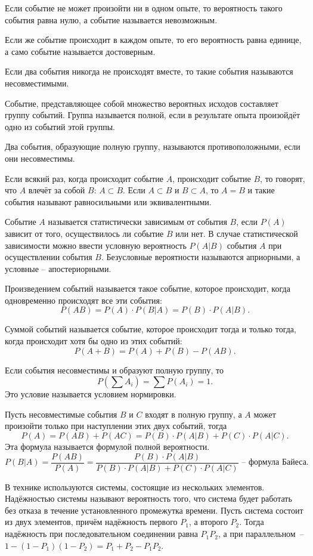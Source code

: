 Если событие не может произойти ни в одном опыте, то вероятность такого события
равна нулю, а событие называется невозможным.

Если же событие происходит в каждом опыте, то его вероятность равна единице, а
само событие называется достоверным.

Если два события никогда не происходят вместе, то такие события называются
несовместимыми.

Событие, представляющее собой множество вероятных исходов составляет группу
событий. Группа называется полной, если в результате опыта произойдёт одно из
событий этой группы.

Два события, образующие полную группу, называются противоположными, если они
несовместимы.

Если всякий раз, когда происходит событие \( A \), происходит событие \( B \),
то говорят, что \( A \) влечёт за собой \( B \): \( A \subset B \). Если
\( A \subset B \) и \( B \subset A \), то \( A = B \) и такие события называют
равносильными или эквивалентными.

Событие \( A \) называется статистически зависимым от события \( B \), если
\( P(A) \) зависит от того, осуществилось ли событие \( B \) или нет. В случае
статистической зависимости можно ввести условную вероятность \( P(A|B) \)
события \( A \) при осуществлении события \( B \). Безусловные вероятности
называются априорными, а условные -- апостериорными.

Произведением событий называется такое событие, которое происходит, когда
одновременно происходят все эти события:
\[
    P(AB) = P(A) \cdot P(B|A) = P(B) \cdot P(A|B).
\]

Суммой событий называется событие, которое происходит тогда и только тогда,
когда происходит хотя бы одно из этих событий:
\[
    P(A+B) = P(A) + P(B) - P(AB).
\]

Если события несовместимы и образуют полную группу, то
\[
    P\left(\sum A_i\right) = \sum P(A_i) = 1.
\]
Это условие называется условием нормировки.

Пусть несовместимые события \( B \) и \( C \) входят в полную группу, а \( A \)
может произойти только при наступлении этих двух событий, тогда
\[
    P(A) = P(AB) + P(AC) = P(B) \cdot P(A|B) + P(C) \cdot P(A|C).
\]
Эта формула называется формулой полной вероятности.
\[
    P(B|A) = \frac{P(AB)}{P(A)} = \frac{P(B) \cdot P(A|B)}
    {P(B) \cdot P(A|B) + P(C) \cdot P(A|C)} \text{ -- формула Байеса.}
\]

В технике используются системы, состоящие из нескольких элементов. Надёжностью
системы называют вероятность того, что система будет работать без отказа в
течение установленного промежутка времени. Пусть система состоит из двух
элементов, причём надёжность первого \( P_1 \), а второго \( P_2 \). Тогда
надёжность при последовательном соединении равна \( P_1P_2 \),  а при
параллельном~--\\ \( 1 - (1 - P_1)(1 - P_2) = P_1 + P_2 - P_1P_2 \).

